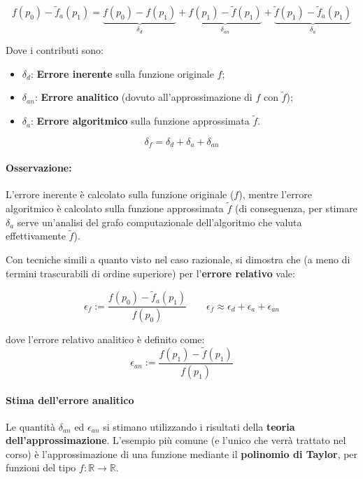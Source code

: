 \documentclass[a4paper,12pt]{article}
\begin{document}
	 \[
	 f(p_0) - \tilde{f}_a(p_1) = \underbrace{f(p_0) - f(p_1)}_{\delta_d} + \underbrace{f(p_1) - \tilde{f}(p_1)}_{\delta_{an}} + \underbrace{\tilde{f}(p_1) - \tilde{f}_a(p_1)}_{\delta_a}
	 \]
	 
	 Dove i contributi sono:
	 \begin{itemize}
	 	\item $\delta_d$: \textbf{Errore inerente} sulla funzione originale $f$;
	 	\item $\delta_{an}$: \textbf{Errore analitico} (dovuto all'approssimazione di $f$ con $\tilde{f}$);
	 	\item $\delta_a$: \textbf{Errore algoritmico} sulla funzione approssimata $\tilde{f}$.
	 \end{itemize}
	 
	 \begin{tcolorbox}[colback=red!5!white]
	 	\[ \delta_f = \delta_d + \delta_a + \delta_{an} \]
	 \end{tcolorbox}
	 
	 \paragraph{Osservazione:} 
	 L'errore inerente è calcolato sulla funzione originale ($f$), mentre l'errore algoritmico è calcolato sulla funzione approssimata $\tilde{f}$ (di conseguenza, per stimare $\delta_a$ serve un'analisi del grafo computazionale dell'algoritmo che valuta effettivamente $\tilde{f}$).
	 
	 Con tecniche simili a quanto visto nel caso razionale, si dimostra che (a meno di termini trascurabili di ordine superiore) per l'\textbf{errore relativo} vale:
	 
	 \begin{equation}
	 	\epsilon_f := \frac{f(p_0) - \tilde{f}_a(p_1)}{f(p_0)} \qquad \epsilon_f \approx \epsilon_d + \epsilon_a + \epsilon_{an}
	 \end{equation}
	 
	 dove l'errore relativo analitico è definito come:
	 \begin{equation}
	 	\epsilon_{an} := \frac{f(p_1) - \tilde{f}(p_1)}{f(p_1)}
	 \end{equation}
	 
	 \paragraph{Stima dell'errore analitico}
	 Le quantità $\delta_{an}$ ed $\epsilon_{an}$ si stimano utilizzando i risultati della \textbf{teoria dell'approssimazione}. L'esempio più comune (e l'unico che verrà trattato nel corso) è l'approssimazione di una funzione mediante il \textbf{polinomio di Taylor}, per funzioni del tipo $f: \mathbb{R} \to \mathbb{R}$.
	
\end{document}
